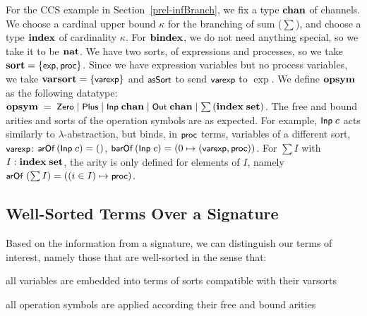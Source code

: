 \documentclass{llncs}
\newenvironment{myitem}[1][]
  {\itemize[leftmargin=*,topsep=0.3ex,itemsep=1pt, #1]}
  {\enditemize}
\begin{document}
For the CCS example in Section~\ref{prel-infBranch}, %
we fix a type $\mbox{\bf chan}$ of channels. 
%
We choose a cardinal upper bound $\kappa$ for the branching of sum ($\sum$), and choose a type 
$\mbox{\bf index}$ of cardinality $\kappa$. %
%
For $\mbox{\bf bindex}$, we do not need anything special, so we take it to be $\mbox{\bf nat}$. 
We have two sorts, of expressions and processes, 
so we take $\mbox{\bf sort} = \{\mbox{\rm\textsf{\small exp}},\mbox{\rm\textsf{\small proc}}\}$.  
Since we have expression variables but no process variables, we take $\mbox{\bf varsort} = \{\mbox{\rm\textsf{\small varexp}}\}$ and $\mbox{\rm\textsf{\small asSort}}$ to send 
$\mbox{\rm\textsf{\small varexp}}$ to $\exp$. 
We define $\mbox{\bf opsym}$ as the following datatype:
%
$\mbox{\bf opsym} \; =\; \mbox{\rm\textsf{\small Zero}} \mid \mbox{\rm\textsf{\small Plus}} \mid \mbox{\rm\textsf{\small Inp}}\;\mbox{\bf chan} \mid \mbox{\rm\textsf{\small Out}}\;\mbox{\bf chan} \mid {\textstyle \sum}\,(\mbox{\bf index}\;\mbox{\bf set})$. 
%
%
The free and bound arities and sorts of the operation symbols are as expected. For example, 
$\mbox{\rm\textsf{\small Inp}}\;c$ acts 
similarly to $\lambda$-abstraction, but binds, in $\mbox{\rm\textsf{\small proc}}$ terms, variables of a different sort, $\mbox{\rm\textsf{\small varexp}}$: 
$\mbox{\rm\textsf{\small arOf}}\,(\mbox{\rm\textsf{\small Inp}}\;c) = ()$, 
$\mbox{\rm\textsf{\small barOf}}\,(\mbox{\rm\textsf{\small Inp}}\;c) = (0\mapsto (\mbox{\rm\textsf{\small varexp}},\mbox{\rm\textsf{\small proc}}))$. 
%
For $\sum I$ with $I:\mbox{\bf index}\;\mbox{\bf set}$, the arity is only defined for elements of $I$, namely  
%
$\mbox{\rm\textsf{\small arOf}}\;(\sum I) = ((i\in I)\mapsto \mbox{\rm\textsf{\small proc}})$. 


\subsection{Well-Sorted Terms Over a Signature}
\label{subsec-termsSig}

Based on the information from a signature, we can distinguish our terms of interest, 
namely those that are well-sorted in the sense that:
\begin{myitem}
\item all %
variables are embedded into terms of sorts compatible with their varsorts 
\item all %
operation symbols are applied according their free and bound arities
\end{myitem}
\end{document}
